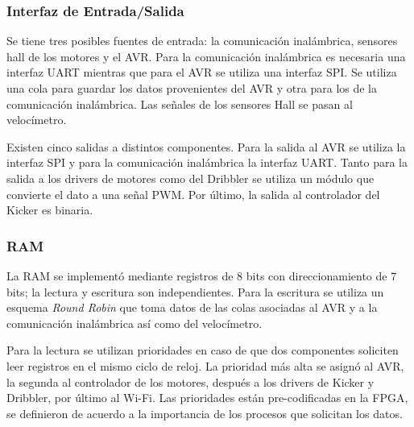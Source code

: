 \subsubsection{Interfaz de Entrada/Salida}

Se tiene tres posibles fuentes de entrada: la comunicación inalámbrica, sensores hall de los motores y el \gls{AVR}. Para la comunicación inalámbrica es necesaria una interfaz \gls{UART} mientras que para el \gls{AVR} se utiliza una interfaz \gls{SPI}. Se utiliza una cola para guardar los datos provenientes del AVR y otra para los de la comunicación inalámbrica. Las señales de los sensores Hall se pasan al velocímetro. 

Existen cinco salidas a distintos componentes. Para la salida al \gls{AVR} se utiliza la interfaz \gls{SPI} y para la comunicación inalámbrica la interfaz \gls{UART}. Tanto para la salida a los drivers de motores como del \gls{Dribbler} se utiliza un módulo que convierte el dato a una señal \gls{PWM}. Por último, la salida al controlador del \gls{Kicker} es binaria.


\subsubsection{RAM}
La \gls{RAM} se implementó mediante registros de 8 bits con direccionamiento de 7 bits; la lectura y escritura son independientes. Para la escritura se utiliza un esquema \textit{Round Robin} que toma datos de las colas asociadas al \gls{AVR} y a la comunicación inalámbrica así como del velocímetro. 

Para la lectura se utilizan prioridades en caso de que dos componentes soliciten leer registros en el mismo ciclo de reloj. La prioridad más alta se asignó al \gls{AVR}, la segunda al controlador de los motores, después a los drivers de \gls{Kicker} y \gls{Dribbler}, por último al \gls{Wi-Fi}. 
Las prioridades están pre-codificadas en la FPGA, se definieron de acuerdo a la importancia de los procesos que solicitan los datos.

